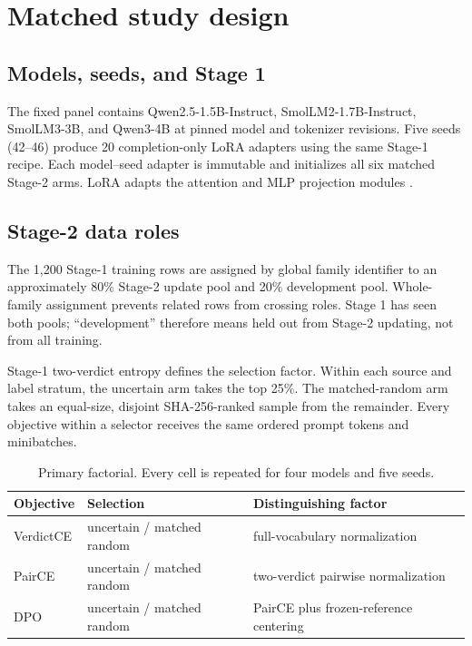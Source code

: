 \section{Matched study design}
\label{sec:design}

\subsection{Models, seeds, and Stage 1}

The fixed panel contains Qwen2.5-1.5B-Instruct, SmolLM2-1.7B-Instruct,
SmolLM3-3B, and Qwen3-4B at pinned model and tokenizer revisions. Five seeds
(42--46) produce 20 completion-only LoRA adapters using the same Stage-1 recipe.
Each model--seed adapter is immutable and initializes all six matched Stage-2
arms. LoRA adapts the attention and MLP projection modules
\citep{hu2021lora}.

\subsection{Stage-2 data roles}

The 1,200 Stage-1 training rows are assigned by global family identifier to an
approximately 80\% Stage-2 update pool and 20\% development pool. Whole-family
assignment prevents related rows from crossing roles. Stage 1 has seen both
pools; ``development'' therefore means held out from Stage-2 updating, not from
all training.

Stage-1 two-verdict entropy defines the selection factor. Within each source and
label stratum, the uncertain arm takes the top 25\%. The matched-random arm takes
an equal-size, disjoint SHA-256-ranked sample from the remainder. Every objective
within a selector receives the same ordered prompt tokens and minibatches.

\begin{table}[t]
\centering
\caption{Primary factorial. Every cell is repeated for four models and five seeds.}
\label{tab:factorial}
\begin{tabular}{lll}
\toprule
Objective & Selection & Distinguishing factor\\
\midrule
VerdictCE & uncertain / matched random & full-vocabulary normalization\\
PairCE    & uncertain / matched random & two-verdict pairwise normalization\\
DPO       & uncertain / matched random & PairCE plus frozen-reference centering\\
\bottomrule
\end{tabular}
\end{table}

